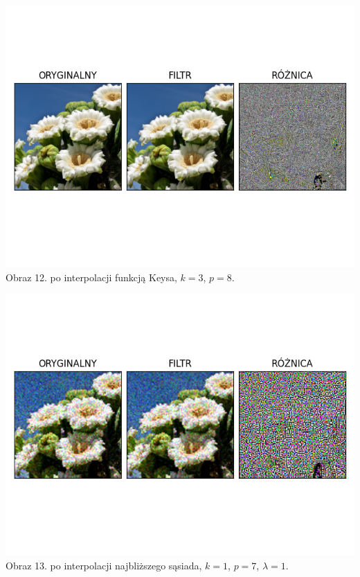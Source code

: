 \documentclass[14pt]{article}
\begin{document}
\begin{center}
    \includegraphics[scale=0.7]{images/keys_k3_p8.png}
    \\ \small Obraz 12. po interpolacji funkcją Keysa,
    $k=3$, $p=8$.


    \includegraphics[scale=0.7]{images/keys_poisson1x_k1_p7.png}
    \\ \small Obraz 13. po interpolacji najbliższego sąsiada, 
    $k=1$, $p=7$, $\lambda=1$.


\end{center}
\end{document}
